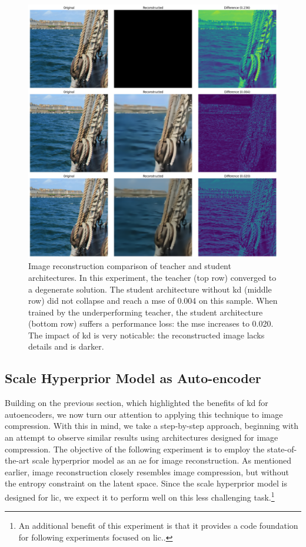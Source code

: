 \begin{figure}
    \centering
    \includegraphics[width=15cm]{../img/kd_ae_test_1.png}
    \caption[Image reconstruction comparison of teacher and student architectures.]{Image reconstruction comparison of teacher and student architectures. In this experiment, the teacher (top row) converged to a degenerate solution. The student architecture without \acrshort{kd} (middle row) did not collapse and reach a \acrshort{mse} of 0.004 on this sample. When trained by the underperforming teacher, the student architecture (bottom row) suffers a performance loss: the \acrshort{mse} increases to 0.020. The impact of \acrshort{kd} is very noticable: the reconstructed image lacks details and is darker.}
    \label{kd_ae_test_1}
\end{figure}

\subsection{Scale Hyperprior Model as Auto-encoder}
\label{scale_hyperprior_ae}
Building on the previous section, which highlighted the benefits of \acrshort{kd} for autoencoders, we now turn our attention to applying this technique to image compression. With this in mind, we take a step-by-step approach, beginning with an attempt to observe similar results using architectures designed for image compression. The objective of the following experiment is to employ the state-of-the-art scale hyperprior model as an \acrshort{ae} for image reconstruction. As mentioned earlier, image reconstruction closely resembles image compression, but without the entropy constraint on the latent space. Since the scale hyperprior model is designed for \acrshort{lic}, we expect it to perform well on this less challenging task.\footnote{An additional benefit of this experiment is that it provides a code foundation for following experiments focused on \acrshort{lic}..}

